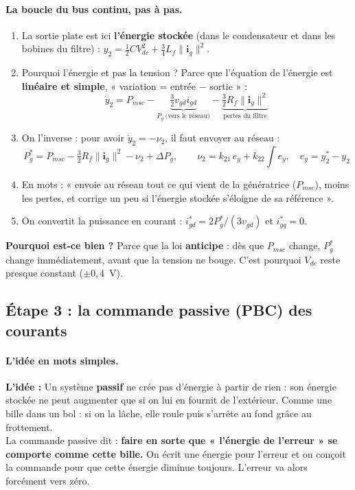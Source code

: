 \documentclass[11pt,a4paper]{article}
\newcommand{\bv}[1]{\boldsymbol{#1}}
\newcommand{\Idee}{\textbf{L'idée : }}
\begin{document}
\paragraph{La boucle du bus continu, pas à pas.}
\begin{enumerate}
\item La sortie plate est ici \textbf{l'énergie stockée} (dans le condensateur et dans les bobines du filtre) :
$y_2 = \tfrac12 C V_{dc}^2 + \tfrac34 L_f\|\bv{i}_g\|^2$.
\item Pourquoi l'énergie et pas la tension ? Parce que l'équation de l'énergie est \textbf{linéaire et simple},
« variation = entrée $-$ sortie » :
\[
\dot y_2 = P_{msc} - \underbrace{\tfrac32 v_{gd} i_{gd}}_{P_g\ \text{(vers le réseau)}} - \underbrace{\tfrac32 R_f\|\bv{i}_g\|^2}_{\text{pertes du filtre}}
\]
\item On l'inverse : pour avoir $\dot y_2 = -\nu_2$, il faut envoyer au réseau :
\begin{equation}
\boxed{P_g^* = P_{msc} - \tfrac32 R_f\|\bv{i}_g\|^2 - \nu_2 + \Delta P_g},\qquad
\nu_2 = k_{21}\,e_y + k_{22}\!\int\! e_y,\quad e_y = y_2^*-y_2
\end{equation}
\item En mots : « envoie au réseau tout ce qui vient de la génératrice ($P_{msc}$), moins les pertes, et
corrige un peu si l'énergie stockée s'éloigne de sa référence ».
\item On convertit la puissance en courant : $i_{gd}^* = 2P_g^*/(3 v_{gd})$ et $i_{gq}^* = 0$.
\end{enumerate}
\textbf{Pourquoi est-ce bien ?} Parce que la loi \textbf{anticipe} : dès que $P_{msc}$ change, $P_g^*$ change
immédiatement, avant que la tension ne bouge. C'est pourquoi $V_{dc}$ reste presque constant ($\pm 0{,}4$~V).

\subsection{Étape 3 : la commande passive (PBC) des courants}

\paragraph{L'idée en mots simples.}
\begin{idee}
\Idee
Un système \textbf{passif} ne crée pas d'énergie à partir de rien : son énergie stockée ne peut augmenter que
si on lui en fournit de l'extérieur. Comme une bille dans un bol : si on la lâche, elle roule puis s'arrête
au fond grâce au frottement.\\
La commande passive dit : \textbf{faire en sorte que « l'énergie de l'erreur » se comporte comme cette bille.}
On écrit une énergie pour l'erreur et on conçoit la commande pour que cette énergie diminue toujours.
L'erreur va alors forcément vers zéro.
\end{idee}
\end{document}
